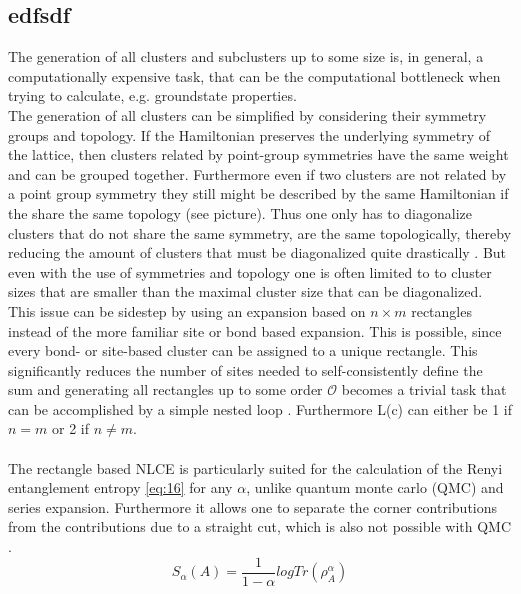 \documentclass{article}
\begin{document}
\subsection{edfsdf}
The generation of all clusters and subclusters up to some size is, in
general, a computationally expensive task, that can be the
computational bottleneck when trying to calculate, e.g. groundstate
properties.\\
The generation of all clusters can be simplified by considering their
symmetry groups and topology. If the Hamiltonian preserves the underlying symmetry of the lattice,
then clusters related by point-group symmetries have the same weight
and can be grouped together. Furthermore even if two clusters are not
related by a point group symmetry they still might be described by the
same Hamiltonian if the share the same topology (see picture). Thus
one only has to diagonalize clusters that do not share the same
symmetry, are the same topologically, thereby reducing the amount of
clusters that must be diagonalized quite drastically \cite{Rigol}.
But even with the use of symmetries and topology one is often limited to
to cluster sizes that are smaller than the maximal cluster size that
can be diagonalized.\\
This issue can be sidestep by using an expansion based on $n \times m$
rectangles instead of the more familiar site or bond based
expansion. This is possible, since every bond- or site-based cluster
can be assigned to a unique rectangle. This significantly reduces the
number of sites needed to self-consistently define the sum and
generating all rectangles up to some order $\mathcal{O}$ becomes a
trivial task that can be accomplished by a simple nested
loop \cite{Kallin}. Furthermore L(c) can either be 1 if $n=m$ or 2 if $n
\neq m$.\\
\\
The rectangle based NLCE is particularly suited for the calculation of the
Renyi entanglement entropy \eqref{eq:16} for any $\alpha$, unlike
quantum monte carlo (QMC) and series expansion. Furthermore it allows one
to separate the corner contributions from the contributions due to a
straight cut, which is also not possible with QMC \cite{Kallin,Melko}.\\
\begin{equation}
\label{eq:16}
S_{\alpha}(A) = \frac{1}{1-\alpha} logTr(\rho^{\alpha}_A)
\end{equation}
\end{document}
